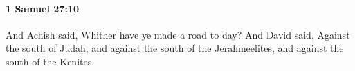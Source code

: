 
		\paragraph{1 Samuel 27:10} %
			\label{1SAMUEL-27-10}

			And Achish said, Whither have ye made a road to day? And David said, Against the south of Judah, and against the south of the Jerahmeelites, and against the south of the Kenites.


